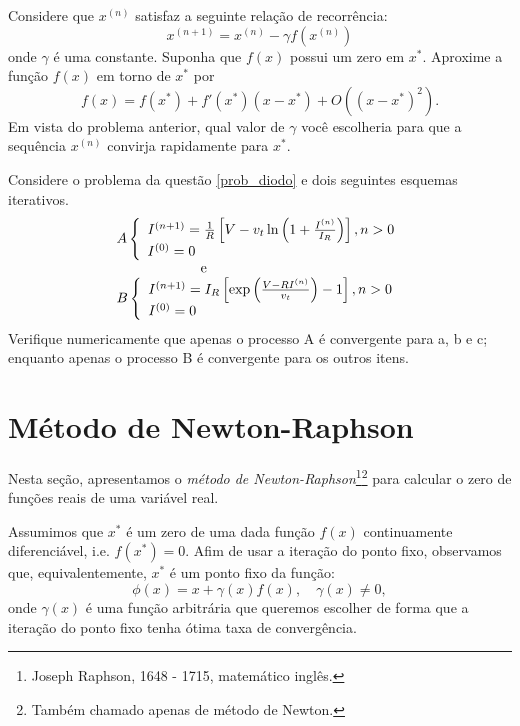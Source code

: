 \begin{Exercise}[title=Aceleração de convergência - introdução ao método de Newton]\label{int_new2} Considere que $x^{(n)}$ satisfaz a seguinte relação de recorrência:
$$x^{(n+1)}=x^{(n)} - \gamma f(x^{(n)})$$
onde $\gamma$ é uma constante. Suponha que $f(x)$ possui um zero em $x^*$. Aproxime a função $f(x)$ em torno de $x^*$ por
$$f(x)=f(x^*)+f'(x^*)(x-x^*)+O\left((x-x^*)^2\right).$$
Em vista do problema anterior, qual valor de $\gamma$ você escolheria para que a sequência $x^{(n)}$ convirja rapidamente para $x^*$. 
\end{Exercise}

\begin{Exercise} Considere o problema da questão \ref{prob_diodo} e dois seguintes esquemas iterativos.
$$\begin{array}{l}
A\left\{
\begin{array}{ll}
I^{(n+1)}=\frac{1}{R}\left[V-v_t\ln\left(1+\frac{I^{(n)}}{I_R}\right)\right],n>0\\
I^{(0)}=0
\end{array}\right.\\ \hspace{2cm} \hbox{ e }\\
B\left\{
\begin{array}{ll}
I^{(n+1)}=I_R\left[\exp\left(\frac{V-RI^{(n)}}{v_t}\right)-1\right],n>0\\
I^{(0)}=0
\end{array}\right.
\end{array}
$$
Verifique numericamente que apenas o processo A é convergente para a, b e c; enquanto apenas o processo B é convergente para os outros itens.
\end{Exercise}

\section{Método de Newton-Raphson}

Nesta seção, apresentamos o \emph{método de Newton-Raphson}\footnote{Joseph Raphson, 1648 - 1715, matemático inglês.}\footnote{Também chamado apenas de método de Newton.} para calcular o zero de funções reais de uma variável real. 

Assumimos que $x^*$ é um zero de uma dada função $f(x)$ continuamente diferenciável, i.e. $f(x^*) = 0$. Afim de usar a iteração do ponto fixo, observamos que, equivalentemente, $x^*$ é um ponto fixo da função:
\begin{equation*}
  \phi(x)= x + \gamma(x)f(x),\quad\gamma(x)\neq 0,
\end{equation*}
onde $\gamma(x)$ é uma função arbitrária que queremos escolher de forma que a iteração do ponto fixo tenha ótima taxa de convergência. 


